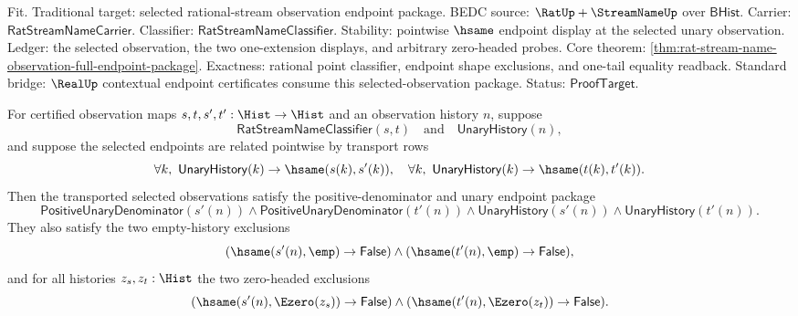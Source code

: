 Fit. Traditional target: selected rational-stream observation endpoint package.
BEDC source: $\RatUp+\StreamNameUp$ over $\mathsf{BHist}$. Carrier:
$\mathsf{RatStreamNameCarrier}$. Classifier:
$\mathsf{RatStreamNameClassifier}$. Stability: pointwise $\hsame$ endpoint
display at the selected unary observation. Ledger: the selected observation, the
two one-extension displays, and arbitrary zero-headed probes. Core theorem:
\autoref{thm:rat-stream-name-observation-full-endpoint-package}. Exactness:
rational point classifier, endpoint shape exclusions, and one-tail equality
readback. Standard bridge: $\RealUp$ contextual endpoint certificates consume
this selected-observation package. Status: $\mathsf{ProofTarget}$.

\begin{theorem}
\label{thm:rat-stream-name-classifier-transported-observation-shape-exclusions}
For certified observation maps $s,t,s',t':\Hist\to\Hist$ and an observation
history $n$, suppose
$$
\mathsf{RatStreamNameClassifier}(s,t)\quad\text{and}\quad
\mathsf{UnaryHistory}(n),
$$
and suppose the selected endpoints are related pointwise by transport rows
$$
\forall k,\ \mathsf{UnaryHistory}(k)\to\hsame(s(k),s'(k)),
\quad
\forall k,\ \mathsf{UnaryHistory}(k)\to\hsame(t(k),t'(k)).
$$
Then the transported selected observations satisfy the positive-denominator and
unary endpoint package
$$
\mathsf{PositiveUnaryDenominator}(s'(n))\land
\mathsf{PositiveUnaryDenominator}(t'(n))\land
\mathsf{UnaryHistory}(s'(n))\land
\mathsf{UnaryHistory}(t'(n)).
$$
They also satisfy the two empty-history exclusions
$$
(\hsame(s'(n),\emp)\to\mathsf{False})\land
(\hsame(t'(n),\emp)\to\mathsf{False}),
$$
and for all histories $z_s,z_t:\Hist$ the two zero-headed exclusions
$$
(\hsame(s'(n),\Ezero(z_s))\to\mathsf{False})\land
(\hsame(t'(n),\Ezero(z_t))\to\mathsf{False}).
$$
\end{theorem}
